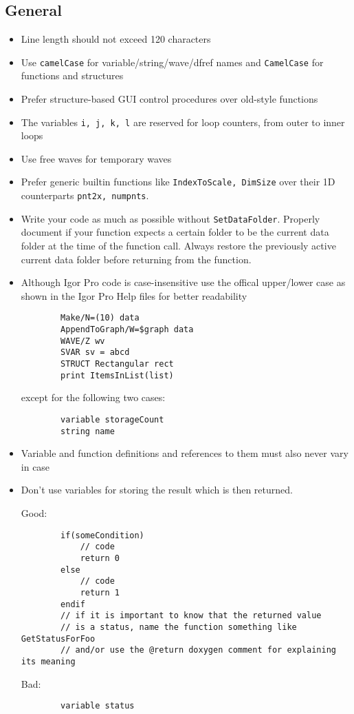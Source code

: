 \documentclass{scrartcl}
\begin{document}
\subsection{General}
%
\begin{itemize}
	\item Line length should not exceed 120 characters
%
	\item Use \texttt{camelCase} for variable/string/wave/dfref names and \texttt{CamelCase} for functions and structures
%
	\item Prefer structure-based GUI control procedures over old-style functions
%
	\item The variables \texttt{i, j, k, l} are reserved for loop counters, from outer to inner loops
%
	\item Use free waves for temporary waves
%
	\item Prefer generic builtin functions like \texttt{IndexToScale, DimSize} over their 1D counterparts \texttt{pnt2x, numpnts}.
%
	\item Write your code as much as possible without \texttt{SetDataFolder}. Properly document if your function expects
	      a certain folder to be the current data folder at the time of the function call. Always restore the previously active current data folder
	      before returning from the function.
%
	\item Although Igor Pro code is case-insensitive use the offical upper/lower case as shown in the Igor Pro Help files for better readability
	\begin{verbatim}
		Make/N=(10) data
		AppendToGraph/W=$graph data
		WAVE/Z wv
		SVAR sv = abcd
		STRUCT Rectangular rect
		print ItemsInList(list)
	\end{verbatim}
	except for the following two cases:
	\begin{verbatim}
		variable storageCount
		string name
	\end{verbatim}
%
	\item Variable and function definitions and references to them must also never vary in case
%
	\item Don't use variables for storing the result which is then returned.\par
	Good:
	\begin{verbatim}
		if(someCondition)
			// code
			return 0
		else
			// code
			return 1
		endif
		// if it is important to know that the returned value
		// is a status, name the function something like GetStatusForFoo
		// and/or use the @return doxygen comment for explaining its meaning
	\end{verbatim}
	\begin{minipage}{\textwidth}
	Bad:
	\begin{verbatim}
		variable status


\end{verbatim}
\end{minipage}
\end{itemize}
\end{document}
